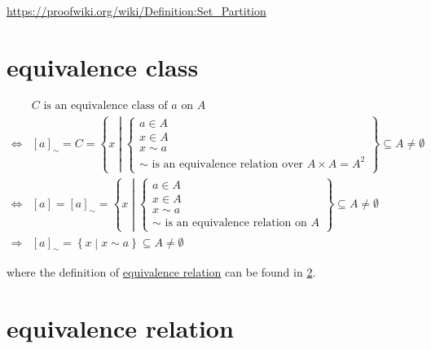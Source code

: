 \documentclass[
]{book}
\theoremstyle{definition}
\theoremstyle{definition}
\theoremstyle{definition}
\theoremstyle{definition}
\theoremstyle{remark}
\begin{document}
\url{https://proofwiki.org/wiki/Definition:Set_Partition}

\hypertarget{equivalence-class}{%
\chapter{equivalence class}\label{equivalence-class}}

\begin{align*}
 & C\text{ is an equivalence class of }a\text{ on }A\\
\Leftrightarrow & \left[a\right]_{\sim}=C=\left\{ x\middle|\begin{cases}
a\in A\\
x\in A\\
x\sim a\\
\sim\text{ is an equivalence relation over }A\times A=A^{2}
\end{cases}\right\} \subseteq A\ne\emptyset\\
\Leftrightarrow & \left[a\right]=\left[a\right]_{\sim}=\left\{ x\middle|\begin{cases}
a\in A\\
x\in A\\
x\sim a\\
\sim\text{ is an equivalence relation on }A
\end{cases}\right\} \subseteq A\ne\emptyset\\
\Rightarrow & \left[a\right]_{\sim}=\left\{ x\middle|x\sim a\right\} \subseteq A\ne\emptyset
\end{align*}

where the definition of \protect\hyperlink{equivalence-relation}{equivalence relation} can be found in \ref{equivalence-relation}.

\hypertarget{equivalence-relation}{%
\chapter{equivalence relation}\label{equivalence-relation}}
\end{document}
